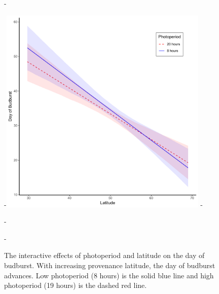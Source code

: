 \documentclass{article}\usepackage[]{graphicx}\usepackage[]{color}
\begin{document}
{\begin{figure} [H]
  -\begin{center}
  -\includegraphics[width=10cm]{..//figures/LatxPhoto_allspp.pdf}
  -\caption{ The interactive effects of photoperiod and latitude on the day of budburst. With increasing provenance latitude, the day of budburst advances. Low photoperiod (8 hours) is the solid blue line and high photoperiod (19 hours) is the dashed red line. }\label{fig:intrxn}
  -\end{center}
  -\end{figure}}
  
\end{document}

